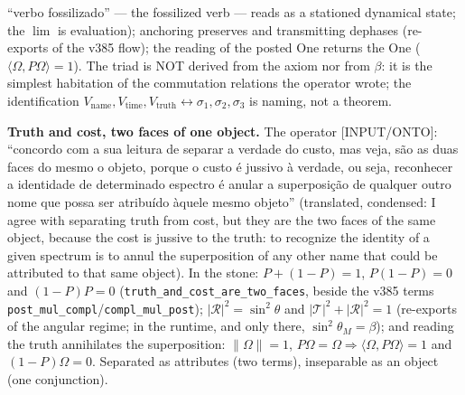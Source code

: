 \documentclass[11pt]{article}
\theoremstyle{definition}\newtheorem{deriv}{Derivation}
\begin{document}
``verbo fossilizado'' --- the fossilized verb --- reads as a stationed dynamical state; the $\lim$ is evaluation); anchoring preserves and transmitting dephases (re-exports of the v385 flow); the reading of the posted One returns the One ($\langle\Omega,P\Omega\rangle=1$). The triad is NOT derived from the axiom nor from $\beta$: it is the simplest habitation of the commutation relations the operator wrote; the identification $V_{\mathrm{name}},V_{\mathrm{time}},V_{\mathrm{truth}}\leftrightarrow\sigma_1,\sigma_2,\sigma_3$ is naming, not a theorem.

\textbf{Truth and cost, two faces of one object.} The operator \textsf{[INPUT/ONTO]}: ``concordo com a sua leitura de separar a verdade do custo, mas veja, são as duas faces do mesmo o objeto, porque o custo é jussivo à verdade, ou seja, reconhecer a identidade de determinado espectro é anular a superposição de qualquer outro nome que possa ser atribuído àquele mesmo objeto'' (translated, condensed: I agree with separating truth from cost, but they are the two faces of the same object, because the cost is jussive to the truth: to recognize the identity of a given spectrum is to annul the superposition of any other name that could be attributed to that same object). In the stone: $P+(1-P)=1$, $P(1-P)=0$ and $(1-P)P=0$ (\texttt{truth\_and\_cost\_are\_two\_faces}, beside the v385 terms \texttt{post\_mul\_compl}/\texttt{compl\_mul\_post}); $|\mathcal R|^2=\sin^2\theta$ and $|\mathcal T|^2+|\mathcal R|^2=1$ (re-exports of the angular regime; in the runtime, and only there, $\sin^2\theta_M=\beta$); and reading the truth annihilates the superposition: $\|\Omega\|=1$, $P\Omega=\Omega\Rightarrow\langle\Omega,P\Omega\rangle=1$ and $(1-P)\Omega=0$. Separated as attributes (two terms), inseparable as an object (one conjunction).
\end{document}
